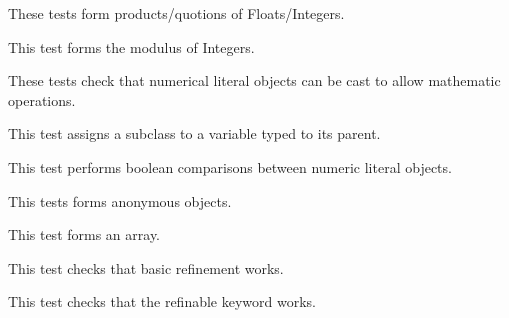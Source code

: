 

These tests form products/quotions of Floats/Integers.



This test forms the modulus of Integers.











These tests check that numerical literal objects can be cast to allow mathematic operations.



This test assigns a subclass to a variable typed to its parent.



This test performs boolean comparisons between numeric literal objects.



This tests forms anonymous objects.



This test forms an array.



This test checks that basic refinement works.



This test checks that the refinable keyword works.

